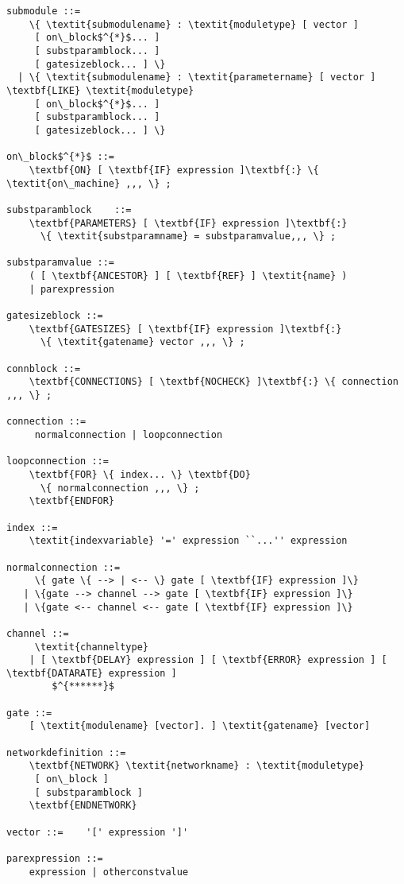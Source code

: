 \begin{Verbatim}[commandchars=\\\{\}]
submodule ::=
    \{ \textit{submodulename} : \textit{moduletype} [ vector ]
     [ on\_block$^{*}$... ]
     [ substparamblock... ]
     [ gatesizeblock... ] \}
  | \{ \textit{submodulename} : \textit{parametername} [ vector ] \textbf{LIKE} \textit{moduletype}
     [ on\_block$^{*}$... ]
     [ substparamblock... ]
     [ gatesizeblock... ] \}

on\_block$^{*}$ ::=
    \textbf{ON} [ \textbf{IF} expression ]\textbf{:} \{ \textit{on\_machine} ,,, \} ;

substparamblock    ::=
    \textbf{PARAMETERS} [ \textbf{IF} expression ]\textbf{:}
      \{ \textit{substparamname} = substparamvalue,,, \} ;

substparamvalue ::=
    ( [ \textbf{ANCESTOR} ] [ \textbf{REF} ] \textit{name} )
    | parexpression

gatesizeblock ::=
    \textbf{GATESIZES} [ \textbf{IF} expression ]\textbf{:}
      \{ \textit{gatename} vector ,,, \} ;

connblock ::=
    \textbf{CONNECTIONS} [ \textbf{NOCHECK} ]\textbf{:} \{ connection ,,, \} ;

connection ::=
     normalconnection | loopconnection

loopconnection ::=
    \textbf{FOR} \{ index... \} \textbf{DO}
      \{ normalconnection ,,, \} ;
    \textbf{ENDFOR}

index ::=
    \textit{indexvariable} '=' expression ``...'' expression

normalconnection ::=
     \{ gate \{ --> | <-- \} gate [ \textbf{IF} expression ]\}
   | \{gate --> channel --> gate [ \textbf{IF} expression ]\}
   | \{gate <-- channel <-- gate [ \textbf{IF} expression ]\}

channel ::=
     \textit{channeltype}
    | [ \textbf{DELAY} expression ] [ \textbf{ERROR} expression ] [ \textbf{DATARATE} expression ]
        $^{******}$

gate ::=
    [ \textit{modulename} [vector]. ] \textit{gatename} [vector]

networkdefinition ::=
    \textbf{NETWORK} \textit{networkname} : \textit{moduletype}
     [ on\_block ]
     [ substparamblock ]
    \textbf{ENDNETWORK}

vector ::=    '[' expression ']'

parexpression ::=
    expression | otherconstvalue


\end{Verbatim}
